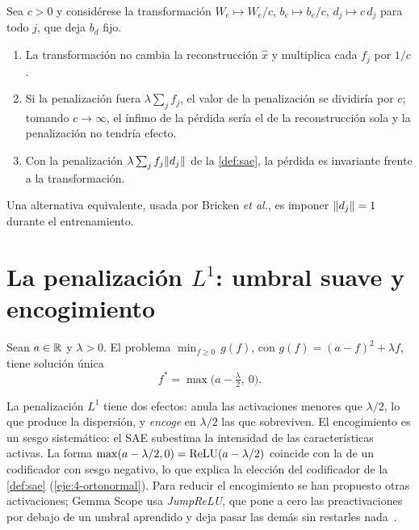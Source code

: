 \addtocounter{figure}{1}%

\begin{proposicion}\label{prop:escala}
Sea $c>0$ y considérese la transformación $W_e\mapsto W_e/c$, $b_e\mapsto b_e/c$, $d_j\mapsto c\,d_j$ para todo $j$, que deja $b_d$ fijo.
\begin{enumerate}
  \item La transformación no cambia la reconstrucción $\hat x$ y multiplica cada $f_j$ por $1/c$.
  \item Si la penalización fuera $\lambda\sum_jf_j$, el valor de la penalización se dividiría por $c$; tomando $c\to\infty$, el ínfimo de la pérdida sería el de la reconstrucción sola y la penalización no tendría efecto.
  \item Con la penalización $\lambda\sum_jf_j\lVert d_j\rVert$ de la \cref{def:sae}, la pérdida es invariante frente a la transformación.
\end{enumerate}
\end{proposicion}

Una alternativa equivalente, usada por Bricken \emph{et al.}, es imponer $\lVert d_j\rVert=1$ durante el entrenamiento.

\addtocounter{definicion}{1}%

\section{La penalización \texorpdfstring{$L^{1}$}{L1}: umbral suave y encogimiento}

\begin{proposicion}\label{prop:umbral}
Sean $a\in\mathbb{R}$ y $\lambda>0$. El problema $\min_{f\ge 0}\,g(f)$, con $g(f)=(a-f)^{2}+\lambda f$, tiene solución única
\[
f^{*}=\max\bigl(a-\tfrac{\lambda}{2},\ 0\bigr).
\]
\end{proposicion}

La penalización $L^{1}$ tiene dos efectos: anula las activaciones menores que $\lambda/2$, lo que produce la dispersión, y \emph{encoge} en $\lambda/2$ las que sobreviven. El encogimiento es un sesgo sistemático: el SAE subestima la intensidad de las características activas. La forma $\max(a-\lambda/2,0)=\operatorname{ReLU}(a-\lambda/2)$ coincide con la de un codificador con sesgo negativo, lo que explica la elección del codificador de la \cref{def:sae} (\cref{eje:4-ortonormal}). Para reducir el encogimiento se han propuesto otras activaciones; Gemma Scope usa \emph{JumpReLU}, que pone a cero las preactivaciones por debajo de un umbral aprendido y deja pasar las demás sin restarles nada~\cite{gemmascope}.


